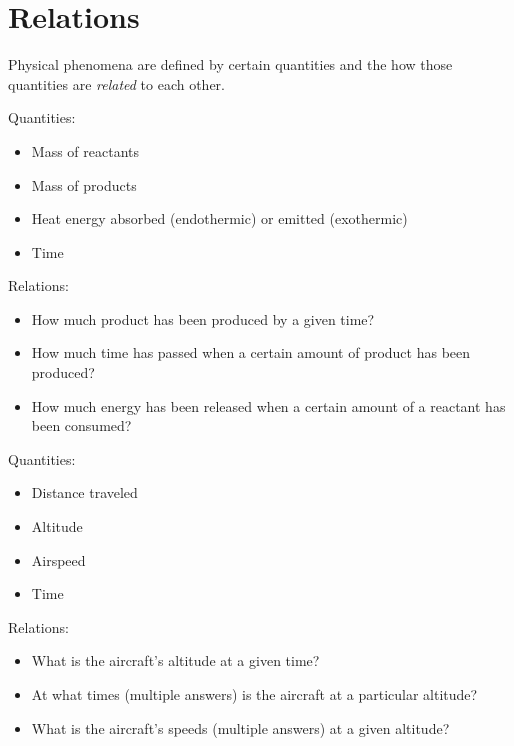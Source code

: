 \documentclass[letterpaper,12pt,fleqn]{article}
\begin{document}
\section*{Relations}

Physical phenomena are defined by certain quantities and the how those quantities are \emph{related} to each other.

\begin{example}
  Quantities:

  \begin{itemize}
  \item Mass of reactants
  \item Mass of products
  \item Heat energy absorbed (endothermic) or emitted (exothermic)
  \item Time
  \end{itemize}

  Relations:

  \begin{itemize}
  \item How much product has been produced by a given time?
  \item How much time has passed when a certain amount of product has been produced?
  \item How much energy has been released when a certain amount of a reactant has been consumed?
  \end{itemize}
\end{example}

\begin{example}
  Quantities:

  \begin{itemize}
  \item Distance traveled
  \item Altitude
  \item Airspeed
  \item Time
  \end{itemize}

  Relations:

  \begin{itemize}
  \item What is the aircraft's altitude at a given time?
  \item At what times (multiple answers) is the aircraft at a particular altitude?
  \item What is the aircraft's speeds (multiple answers) at a given altitude?
  \end{itemize}
\end{example}
\end{document}
